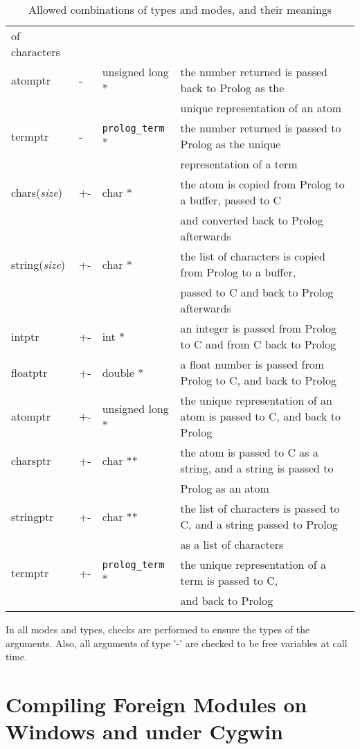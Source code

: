 \begin{table}
\begin{tabular}{||l|l|l|l||}
of characters \\
atomptr & - & unsigned long * & the number returned is passed back to
Prolog as the \\
 & & & unique representation of an atom \\
termptr & - & {\tt prolog\_term} * & the number returned is passed to Prolog
as the unique\\
 & & & representation of a term \\
\hline
chars(\emph{size}) & +- & char * & the atom is copied from Prolog to a
buffer, passed to C \\
 & & & and converted back to Prolog afterwards \\
string(\emph{size}) & +- & char * & the list of characters is copied
from Prolog to a buffer, \\
 & & & passed to C and back to Prolog afterwards \\
intptr & +- & int * & an integer is passed from Prolog to C and from C
back to Prolog \\
floatptr & +- & double * & a float number is passed from Prolog to C,
and back to Prolog \\
atomptr & +- & unsigned long * & the unique representation of an atom
is passed to C, and back to Prolog \\
charsptr & +- & char ** & the atom is passed to C as a string, and 
a string is passed to\\
 & & & Prolog as an atom \\
stringptr & +- & char ** & the list of characters is passed to C, and
a string passed to Prolog \\
 & & & as a list of characters \\
termptr & +- & {\tt prolog\_term} * & the unique representation of a term is
passed to C, \\
 & & & and back to Prolog \\
\hline
\hline
\end{tabular}
\caption{Allowed combinations of types and modes, and their meanings}
\label{tbl-types-p}
\end{table}

In all modes and types, checks are performed to ensure the types of
the arguments. Also, all arguments of type '-' are checked to be free
variables at call time.

\section{Compiling Foreign Modules on Windows and under Cygwin} 
\label{sec:foreign-windows}

